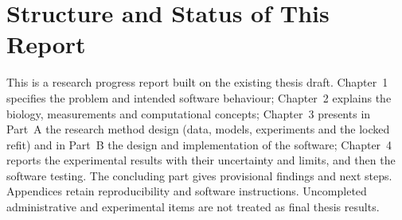 \section{Structure and Status of This Report}
This is a research progress report built on the existing thesis draft. Chapter~1 specifies the problem
and intended software behaviour; Chapter~2 explains the biology, measurements and computational
concepts; Chapter~3 presents in Part~A the research method design (data, models, experiments
and the locked refit) and in Part~B the design and implementation of the software; Chapter~4 reports
the experimental results with their uncertainty and limits, and then the software testing. The concluding part gives provisional findings and
next steps. Appendices retain reproducibility and software instructions. Uncompleted administrative and
experimental items are not treated as final thesis results.
